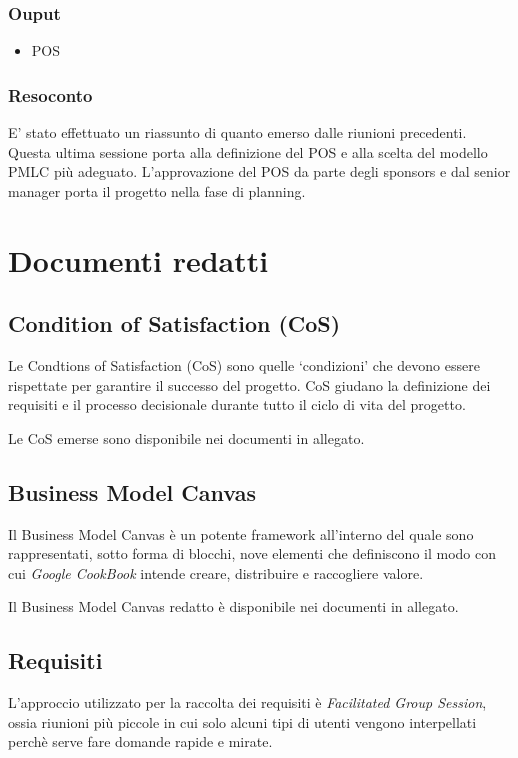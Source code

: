 \subsubsection*{Ouput}
\begin{itemize}
    \item POS
\end{itemize} 
\subsubsection*{Resoconto}
E' stato effettuato un riassunto di quanto emerso dalle riunioni precedenti.
Questa ultima sessione porta alla definizione del POS e alla scelta del modello PMLC più adeguato. 
L'approvazione del POS da parte degli sponsors e dal senior manager porta il progetto nella fase di planning.


\section{Documenti redatti}

\subsection{Condition of Satisfaction (CoS)}

Le Condtions of Satisfaction (CoS) sono quelle `condizioni' che devono essere rispettate 
per garantire il successo del progetto. CoS giudano la definizione dei requisiti e il processo decisionale
durante tutto il ciclo di vita del progetto.

Le CoS emerse sono disponibile nei documenti in allegato.

\subsection{Business Model Canvas}
Il Business Model Canvas è un potente framework all'interno del quale sono rappresentati, sotto
forma di blocchi, nove elementi che definiscono il modo con cui \textit{Google CookBook} intende creare, distribuire
e raccogliere valore.

Il Business Model Canvas redatto è disponibile nei documenti in allegato.

\subsection{Requisiti}

L'approccio utilizzato per la raccolta dei requisiti è \textit{Facilitated Group Session}, ossia riunioni più piccole 
in cui solo alcuni tipi di utenti vengono interpellati perchè serve fare domande rapide e mirate.


